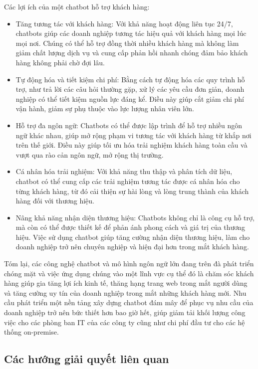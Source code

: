 Các lợi ích của một chatbot hỗ trợ khách hàng:
\begin{itemize}
    \item Tăng tương tác với khách hàng: Với khả năng hoạt động liên tục 24/7, chatbots giúp các doanh nghiệp tương tác hiệu quả với khách hàng mọi lúc mọi nơi. Chúng có thể hỗ trợ đồng thời nhiều khách hàng mà không làm giảm chất lượng dịch vụ và cung cấp phản hồi nhanh chóng đảm bảo khách hàng không phải chờ đợi lâu.
    \item Tự động hóa và tiết kiệm chi phí: Bằng cách tự động hóa các quy trình hỗ trợ, như trả lời các câu hỏi thường gặp, xử lý các yêu cầu đơn giản, doanh nghiệp có thể tiết kiệm nguồn lực đáng kể. Điều này giúp cắt giảm chi phí vận hành, giảm sự phụ thuộc vào lực lượng nhân viên lớn.
    \item Hỗ trợ đa ngôn ngữ: Chatbots có thể được lập trình để hỗ trợ nhiều ngôn ngữ khác nhau, giúp mở rộng phạm vi tương tác với khách hàng từ khắp nơi trên thế giới. Điều này giúp tối ưu hóa trải nghiệm khách hàng toàn cầu và vượt qua rào cản ngôn ngữ, mở rộng thị trường.
    \item Cá nhân hóa trải nghiệm: Với khả năng thu thập và phân tích dữ liệu, chatbot có thể cung cấp các trải nghiệm tương tác được cá nhân hóa cho từng khách hàng, từ đó cải thiện sự hài lòng và lòng trung thành của khách hàng đối với thương hiệu.
    \item Nâng khả năng nhận diện thương hiệu: Chatbots không chỉ là công cụ hỗ trợ, mà còn có thể được thiết kế để phản ánh phong cách và giá trị của thương hiệu. Việc sử dụng chatbot giúp tăng cường nhận diện thương hiệu, làm cho doanh nghiệp trở nên chuyên nghiệp và hiện đại hơn trong mắt khách hàng.
\end{itemize}

Tóm lại, các công nghệ chatbot và mô hình ngôn ngữ lớn	đang trên đà phát triển chóng mặt và việc ứng dụng chúng vào một lĩnh vực cụ thể đó là chăm sóc khách hàng giúp gia tăng lợi ích kinh tế, thăng hạng trang web trong mắt người dùng và tăng cường uy tín của doanh nghiệp trong mắt những khách hàng mới. Nhu cầu phát triển một nền tảng xây dựng chatbot đám mây để phục vụ nhu cầu của doanh nghiệp trở nên bức thiết hơn bao giờ hết, giúp giảm tải khối lượng công việc cho các phòng ban IT của các công ty cũng như chi phí đầu tư cho các hệ thống on-premise.

\subsection{Các hướng giải quyết liên quan}

